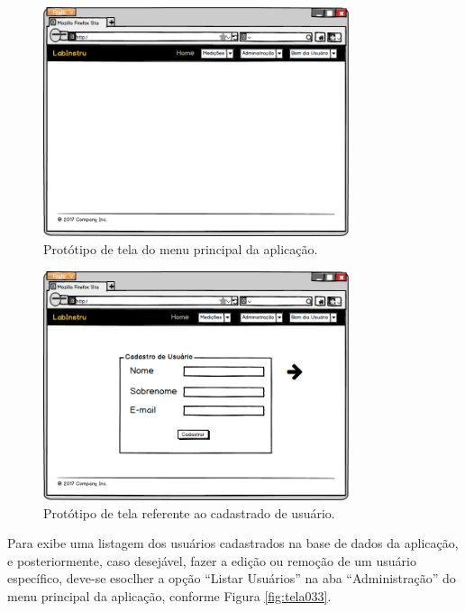 \begin{figure}[H]
	\centering
	\includegraphics[width=0.8\textwidth]{./img/telas/tela025.png}
	\caption{Protótipo de tela do menu principal da aplicação.} \label{fig:tela025}
\end{figure}


\begin{figure}[H]
	\centering
	\includegraphics[width=0.8\textwidth]{./img/telas/tela027.png}
	\caption{Protótipo de tela referente ao cadastrado de usuário.} \label{fig:tela027}
\end{figure}

Para exibe uma listagem dos usuários cadastrados na base de dados da aplicação, e posteriormente, caso desejável, fazer a edição ou remoção de um usuário específico, deve-se esoclher a opção ``Listar Usuários'' na aba ``Administração'' do menu principal da aplicação, conforme Figura \ref{fig:tela033}.

